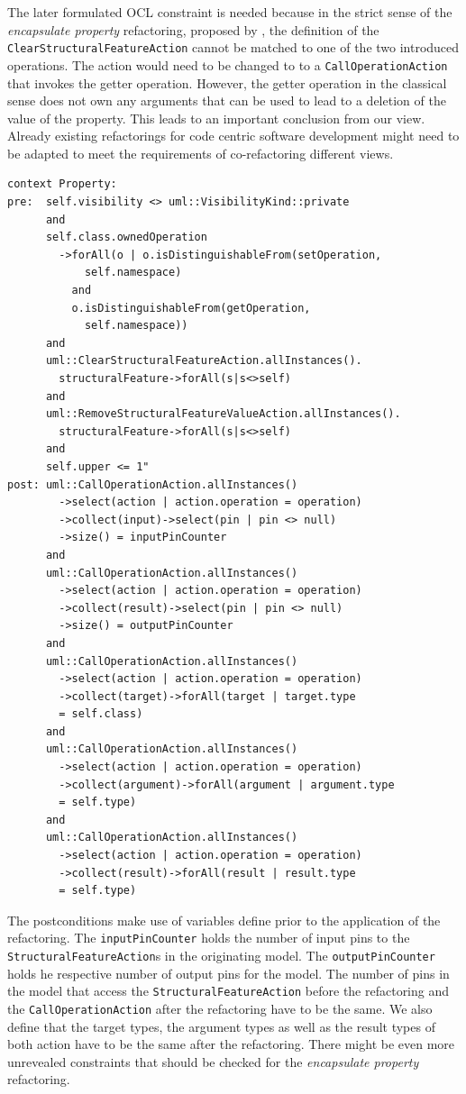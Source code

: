 \documentclass{llncs}
\begin{document}
The later formulated OCL constraint is needed 
because in the strict sense of the \textit{encapsulate property} refactoring, proposed by \cite{fow99}, the definition of the 
\texttt{Clear\-Structural\-Feature\-Action} cannot be matched to one of the two introduced operations. The action would need to be 
changed to to a \texttt{Call\-Operation\-Action} that invokes the getter operation. However, the getter operation in the classical 
sense does not own any arguments that can be used to lead to a deletion of the value of the property. This leads to an important 
conclusion from our view. Already existing refactorings for code centric software development might need to be adapted to meet the 
requirements of co-refactoring different views.

\begin{lstlisting}[language=OCL,caption=OCL for \textit{encapsulate property} refactoring,label=lst:encapsulate]
context Property:
pre:  self.visibility <> uml::VisibilityKind::private 
      and 
      self.class.ownedOperation
        ->forAll(o | o.isDistinguishableFrom(setOperation, 
            self.namespace)
          and 
          o.isDistinguishableFrom(getOperation, 
            self.namespace)) 
      and 
      uml::ClearStructuralFeatureAction.allInstances().
        structuralFeature->forAll(s|s<>self)
      and
      uml::RemoveStructuralFeatureValueAction.allInstances().
        structuralFeature->forAll(s|s<>self)
      and
      self.upper <= 1"
post: uml::CallOperationAction.allInstances()
        ->select(action | action.operation = operation)
        ->collect(input)->select(pin | pin <> null)
        ->size() = inputPinCounter
      and
      uml::CallOperationAction.allInstances()
        ->select(action | action.operation = operation)
        ->collect(result)->select(pin | pin <> null)
        ->size() = outputPinCounter
      and
      uml::CallOperationAction.allInstances()
        ->select(action | action.operation = operation)
        ->collect(target)->forAll(target | target.type 
        = self.class)
      and 
      uml::CallOperationAction.allInstances()
        ->select(action | action.operation = operation)
        ->collect(argument)->forAll(argument | argument.type 
        = self.type)
      and
      uml::CallOperationAction.allInstances()
        ->select(action | action.operation = operation)
        ->collect(result)->forAll(result | result.type 
        = self.type)
\end{lstlisting}

The postconditions make use of variables define prior to the application of the refactoring. The \texttt{input\-Pin\-Counter} holds 
the number of input pins to the \texttt{Structural\-Feature\-Action}s in the originating model. The \texttt{output\-Pin\-Counter} holds 
he respective number of output pins for the model. The number of pins in the model that access the \texttt{Structural\-Feature\-Action} 
before the refactoring and the \texttt{Call\-Operation\-Action} after the refactoring have to be the same. We also define that the 
target types, the argument types as well as the result types of both action have to be the same after the refactoring. There might be 
even more unrevealed constraints that should be checked for the \textit{encapsulate property} refactoring.
\end{document}
